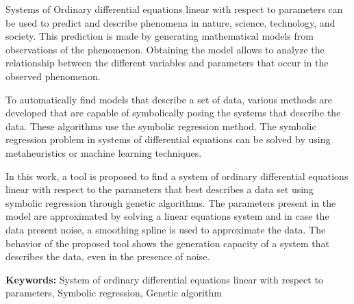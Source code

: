 \begin{enabstract}

    Systems of Ordinary differential equations linear with respect to parameters can be used to predict and describe phenomena in nature, science, technology, and society. This prediction is made by generating mathematical models from observations of the phenomenon. Obtaining the model allows to analyze the relationship between the different variables and parameters that occur in the observed phenomenon.

    To automatically find models that describe a set of data, various methods are developed that are capable of symbolically posing the systems that describe the data. These algorithms use the symbolic regression method. The symbolic regression problem in systems of differential equations can be solved by using metaheuristics or machine learning techniques.

    In this work, a tool is proposed to find a system of ordinary differential equations linear with respect to the parameters that best describes a data set using symbolic regression through genetic algorithms. The parameters present in the model are approximated by solving a linear equations system and in case the data present noise, a smoothing spline is used to approximate the data. The behavior of the proposed tool shows the generation capacity of a system that describes the data, even in the presence of noise.

    \textbf{Keywords:} System of ordinary differential equations linear with respect to parameters, Symbolic regression, Genetic algorithm
\end{enabstract}